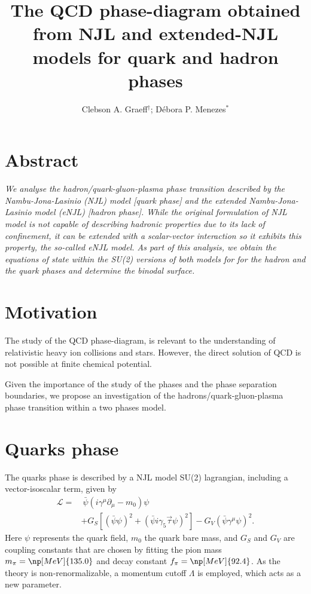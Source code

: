 \documentclass[plainsections,alongposter]{sciposterlocal}
\title{The QCD phase-diagram obtained from NJL and extended-NJL models for quark and hadron phases}
\author{Clebson A. Graeff$^\dagger$; Débora P. Menezes$^*$}
\institute{$^\dagger$~Universidade Tecnológica Federal do Paraná -- Pato Branco, PR - Brazil \\
$^*$~Universidade Federal de Santa Catarina -- Florian\'opolis, SC - Brazil \\
}
\begin{document}
\maketitle %

\begin{multicols}{2} %

\section*{Abstract}
{ \it
We analyse the hadron/quark-gluon-plasma phase transition described by the Nambu-Jona-Lasinio (NJL) model [quark phase] and the extended Nambu-Jona-Lasinio model (eNJL) [hadron phase]. While the original formulation of NJL model is not capable of describing hadronic properties due to its lack of confinement, it can be extended with a scalar-vector interaction so it exhibits this property, the so-called  eNJL model. As part of this analysis, we obtain the equations of state within the SU(2) versions of both models for
for the hadron and the quark phases and determine the binodal surface. 
}

\section*{Motivation}

The study of the QCD phase-diagram, is relevant to the understanding of relativistic heavy ion collisions and stars. However, the direct solution of QCD is not possible at finite chemical potential.

Given the importance of the study of the phases and the phase separation boundaries, we propose an investigation of the hadrons/quark-gluon-plasma phase transition within a two phases model.


 
\section*{Quarks phase}

The quarks phase is described by a NJL model SU(2) lagrangian, including a vector-isoscalar term, given by\cite{Buballa2005}
\begin{equation*}\label{Eq:LagNJL-SU2-Bub}
\begin{split}
	\mathcal{L} =&~ \bar{\psi}(i\gamma^\mu\partial_\mu - m_0)\psi \\
	&+ G_S[(\bar{\psi}\psi)^2 + (\bar{\psi}i\gamma_5\vec{\tau}\psi)^2] - G_V(\bar{\psi}\gamma^\mu \psi)^2.
\end{split}
\end{equation*}
%
Here $\psi$ represents the quark field, $m_0$ the quark bare mass, and $G_S$ and $G_V$ are coupling constants that are chosen by fitting the pion mass $m_\pi = \np[MeV]{135.0}$ and decay constant $f_\pi = \np[MeV]{92.4}$. As the theory is non-renormalizable, a momentum cutoff $\Lambda$ is employed, which acts as a new parameter.


\end{multicols}
\end{document}
